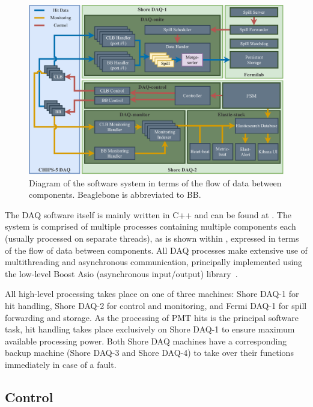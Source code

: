\begin{figure} %
    \includegraphics[width=\textwidth]{diagrams/5-daq/daq_software.pdf}
    \caption[Diagram of the \chipsfive software system in terms of the flow of data between
    components] {Diagram of the \chipsfive software system in terms of the flow of data between
    components. Beaglebone is abbreviated to BB.}
    \label{fig:daq_software}
\end{figure}

The DAQ software itself is mainly written in C++ and can be found at .
The system is comprised of multiple processes containing multiple components each (usually
processed on separate threads), as is shown within , expressed in
terms of the flow of data between components. All DAQ processes make extensive use of
multithreading and asynchronous communication, principally implemented using the low-level Boost
Asio (asynchronous input/output) library~\cite{boost2020}. 

All high-level processing takes place on one of three machines: Shore DAQ-1 for hit handling,
Shore DAQ-2 for control and monitoring, and Fermi DAQ-1 for \numi spill forwarding and storage. As
the processing of PMT hits is the principal software task, hit handling takes place exclusively on
Shore DAQ-1 to ensure maximum available processing power. Both Shore DAQ machines have a
corresponding backup machine (Shore DAQ-3 and Shore DAQ-4) to take over their functions
immediately in case of a fault.

\subsection{Control} %
\label{sec:daq_soft_control} %

